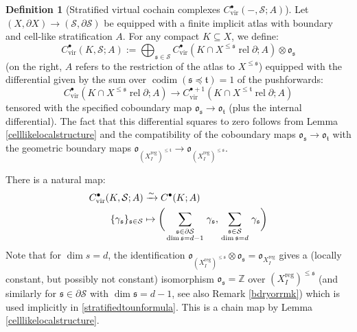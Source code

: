 \documentclass[12pt]{article}
\theoremstyle{definition}
\newtheorem{definition}[theorem]{Definition}
\theoremstyle{remark}
\numberwithin{equation}{subsection}
\newcommand{\s}{\mathfrak s}
\newcommand{\ttt}{\mathfrak t}
\newcommand{\oo}{\mathfrak o}
\newcommand{\ZZ}{\mathbb Z}
\newcommand{\SSS}{\mathcal S}
\newcommand{\codim}{\operatorname{codim}}
\newcommand{\vir}{\mathrm{vir}}
\newcommand{\reg}{\mathrm{reg}}
\newcommand{\rel}{\operatorname{rel}}
\begin{document}
\begin{definition}[Stratified virtual cochain complexes $C^\bullet_\vir(-,\SSS;A)$]\label{stratifiedvirtualdef}
Let $(X,\partial X)\to(\SSS,\partial\SSS)$ be equipped with a finite implicit atlas with boundary and cell-like stratification $A$.  For any compact $K\subseteq X$, we define:
\begin{equation}\label{virtualchainswithcornersdef}
C^\bullet_\vir(K,\SSS;A):=\bigoplus_{\s\in\SSS}C^\bullet_\vir(K\cap X^{\leq\s}\rel\partial;A)\otimes\oo_\s
\end{equation}
(on the right, $A$ refers to the restriction of the atlas to $X^{\leq\s}$) equipped with the differential given by the sum over $\codim(\s\preceq\ttt)=1$ of the pushforwards:
\begin{equation}\label{stratumpushforward}
C^\bullet_\vir(K\cap X^{\leq\s}\rel\partial;A)\to C^{\bullet+1}_\vir(K\cap X^{\leq\ttt}\rel\partial;A)
\end{equation}
tensored with the specified coboundary map $\oo_\s\to\oo_\ttt$ (plus the internal differential).  The fact that this differential squares to zero follows from Lemma \ref{celllikelocalstructure} and the compatibility of the coboundary maps $\oo_\s\to\oo_\ttt$ with the geometric boundary maps $\oo_{(X_I^\reg)^{\leq\ttt}}\to\oo_{(X_I^\reg)^{\leq\s}}$.

There is a natural map:
\begin{align}\label{stratifiedtounstratifiedpushforward}
C^\bullet_\vir(K,\SSS;A)&\xrightarrow\sim C^\bullet(K;A)\\
\label{stratifiedtounformula}\{\gamma_\s\}_{\s\in\SSS}&\mapsto\biggl(\sum_{\begin{smallmatrix}\s\in\partial\SSS\cr\dim\s=d-1\end{smallmatrix}}\gamma_\s,\sum_{\begin{smallmatrix}\s\in\SSS\cr\dim\s=d\end{smallmatrix}}\gamma_\s\biggr)
\end{align}
Note that for $\dim s=d$, the identification $\oo_{(X_I^\reg)^{\leq\s}}\otimes\oo_\s=\oo_{X_I^\reg}$ gives a (locally constant, but possibly not constant) isomorphism $\oo_\s=\ZZ$ over $(X_I^\reg)^{\leq\s}$ (and similarly for $\s\in\partial\SSS$ with $\dim\s=d-1$, see also Remark \ref{bdryorrmk}) which is used implicitly in \eqref{stratifiedtounformula}.  This is a chain map by Lemma \ref{celllikelocalstructure}.
\end{definition}
\end{document}
